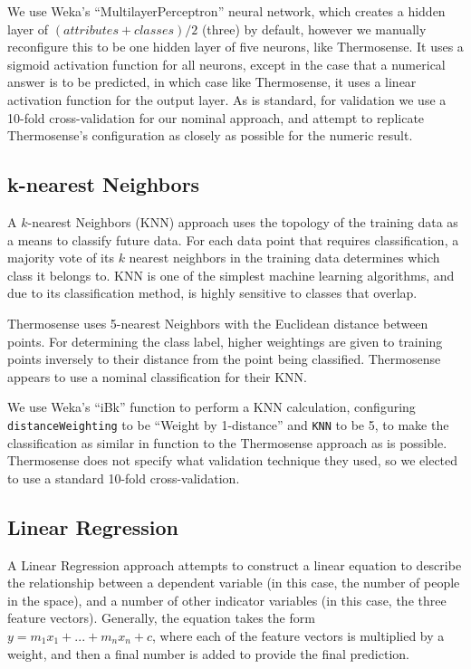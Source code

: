 \documentclass[../thesis/thesis.tex]{subfiles}
\begin{document}
We use Weka's ``MultilayerPerceptron'' neural network, which creates a hidden layer of $(\mathit{attributes} + \mathit{classes}) / 2$ (three) by default, however we manually reconfigure this to be one hidden layer of five neurons, like Thermosense. It uses a sigmoid activation function for all neurons, except in the case that a numerical answer is to be predicted, in which case like Thermosense, it uses a linear activation function for the output layer. As is standard, for validation we use a 10-fold cross-validation for our nominal approach, and attempt to replicate Thermosense's configuration as closely as possible for the numeric result. %

\subsection{k-nearest Neighbors}
A $k$-nearest Neighbors (KNN) approach uses the topology of the training data as a means to classify future data. For each data point that requires classification, a majority vote of its $k$ nearest neighbors in the training data determines which class it belongs to. KNN is one of the simplest machine learning algorithms, and due to its classification method, is highly sensitive to classes that overlap. 

Thermosense uses 5-nearest Neighbors with the Euclidean distance between points. For determining the class label, higher weightings are given to training points inversely to their distance from the point being classified. Thermosense appears to use a nominal classification for their KNN.

We use Weka's ``iBk'' function to perform a KNN calculation, configuring \texttt{distanceWeighting} to be ``Weight by 1-distance'' and \texttt{KNN} to be 5, to make the classification as similar in function to the Thermosense approach as is possible. Thermosense does not specify what validation technique they used, so we elected to use a standard 10-fold cross-validation.

\subsection{Linear Regression}
A Linear Regression approach attempts to construct a linear equation to describe the relationship between a dependent variable (in this case, the number of people in the space), and a number of other indicator variables (in this case, the three feature vectors). Generally, the equation takes the form $y = m_1x_1 + ... + m_nx_n + c$, where each of the feature vectors is multiplied by a weight, and then a final number is added to provide the final prediction.
\end{document}
